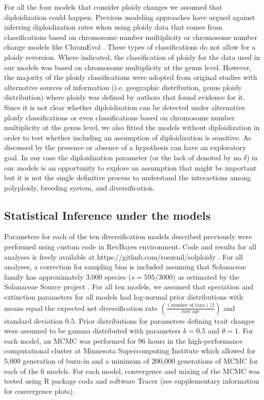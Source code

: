 For all the four models that consider ploidy changes we assumed that diploidization could happen. Previous modeling approaches \citep{mayrose_2011} have argued against inferring diploidization rates when using ploidy data that comes from classifications based on chromosome number multiplicity or chromosome number change models like ChromEvol \citep{mayrose_2010}. These types of classifications do not allow for a ploidy reversion. Where indicated, the classification of ploidy for the data used in our models was based on chromosome multiplicity at the genus level. However, the majority of the ploidy classifications were adopted from original studies with alternative sources of information (i.e. geographic distribution, genus ploidy distribution) where ploidy was defined by authors that found evidence for it. Since it is not clear whether diploidization can be detected under alternative ploidy classifications or even classifications based on chromosome number multiplicity at the genus level, we also fitted the models without diploidization in order to test  whether including an assumption of diploidization is sensitive. As discussed by \citet{servedio_2014}  the presence or absence of a hypothesis can have an exploratory goal. In our case the diploidization parameter (or the lack of denoted by no $\delta$) in our models  is an opportunity to explore an assumption that might be important but it is not the single definitive process to understand the interactions among polyploidy, breeding system, and diversification.

\subsection{Statistical Inference under the models}

Parameters for each of the ten diversification models described previously were performed using custom code in RevBayes \citep{hoehna_2016} environment. Code and results for all analyses is freely available at https://github.com/roszenil/solploidy . For all analyses, a correction for sampling bias is included assuming that Solanaceae family has approximately 3,000 species ($s=595/3000$) as estimated by the Solanaceae Source project \citep{solsource}. For all ten models, we assumed that speciation and extinction parameters for all models  had log-normal prior distributions with means equal the expected net diversification rate $ ( \frac{(\textrm{number of taxa})/2}{\textrm{root age}})$ and standard deviation $0.5$.
Prior distributions for parameters defining trait changes were  assumed to be gamma distributed with parameters $k=0.5$ and $\theta=1$. 
For each model, an MCMC was performed for 96 hours in the high-performance computational cluster at Minnesota Supercomputing Institute which allowed for 5,000 generation of burn-in and a minimum of 200,000 generations of MCMC for each of the 6 models. For each model, convergence and mixing of the MCMC was tested using R package coda and software Tracer (see supplementary information for convergence plots).

